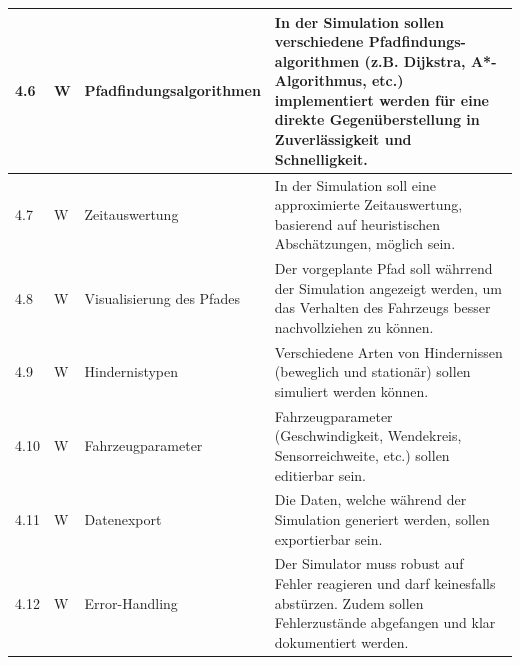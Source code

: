 \documentclass[../main.tex]{subfiles}
\begin{document}
\begin{tabular}{|l|p{0.5cm}|p{4cm}|p{10cm}|}
  \hline
  4.6          & W          & Pfadfindungsalgorithmen   & In der Simulation sollen verschiedene Pfadfindungs-algorithmen (z.B. Dijkstra, A*-Algorithmus, etc.) implementiert werden für eine direkte Gegenüberstellung in Zuverlässigkeit und Schnelligkeit. \\
  \hline
  4.7          & W          & Zeitauswertung            & In der Simulation soll eine approximierte Zeitauswertung, basierend auf heuristischen Abschätzungen, möglich sein.                                                                                 \\
  \hline
  4.8          & W          & Visualisierung des Pfades & Der vorgeplante Pfad soll währrend der Simulation angezeigt werden, um das Verhalten des Fahrzeugs besser nachvollziehen zu können.                                                                \\
  \hline
  4.9          & W          & Hindernistypen            & Verschiedene Arten von Hindernissen (beweglich und stationär) sollen simuliert werden können.                                                                                                      \\
  \hline
  4.10         & W          & Fahrzeugparameter         & Fahrzeugparameter (Geschwindigkeit, Wendekreis, Sensorreichweite, etc.) sollen editierbar sein.                                                                                                    \\
  \hline
  4.11         & W          & Datenexport               & Die Daten, welche während der Simulation generiert werden, sollen exportierbar sein.                                                                                                               \\
  \hline
  4.12         & W          & Error-Handling            & Der Simulator muss robust auf Fehler reagieren und darf keinesfalls abstürzen. Zudem sollen Fehlerzustände abgefangen und klar dokumentiert werden.                                                \\
  \hline
\end{tabular}
\end{document}
